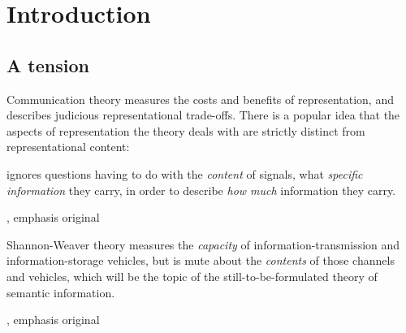 \documentclass[12pt]{article}
\begin{document}
\maketitle



\section{Introduction}\label{sec:intro}

\subsection{A tension}

Communication theory measures the costs and benefits of representation, and describes judicious representational trade-offs. 
There is a popular idea that the aspects of representation the theory deals with are strictly distinct from representational content:

\begin{myquote}
 ignores questions having to do with the \emph{content} of signals, what \emph{specific information} they carry, in order to describe \emph{how much} information they carry.
\par\hspace*{\fill}\citet[41]{dretske1981knowledge}, emphasis original
\end{myquote}

\begin{myquote}
Shannon-Weaver theory measures the \emph{capacity} of information-transmission and information-storage vehicles, but is mute about the \emph{contents} of those channels and vehicles, which will be the topic of the still-to-be-formulated theory of semantic information.
\par\hspace*{\fill}\citet[344]{dennett1983intentional}, emphasis original
\end{myquote}
\end{document}
